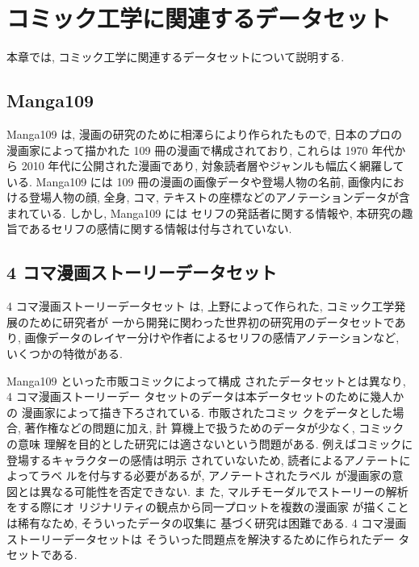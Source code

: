 \newpage
\changeindent{0cm}
\section{コミック工学に関連するデータセット}
\changeindent{2cm}

本章では, コミック工学に関連するデータセットについて説明する.

\changeindent{0cm}
\subsection{Manga109}
\changeindent{2cm}

Manga109 \cite{mtap_matsui_2017} は,
漫画の研究のために相澤らにより作られたもので, 日本のプロの漫画家によって描かれた 109 冊の漫画で構成されており, これらは 1970 年代から 2010 年代に公開された漫画であり, 対象読者層やジャンルも幅広く網羅している. Manga109 には 109 冊の漫画の画像データや登場人物の名前, 画像内における登場人物の顔, 全身, コマ, テキストの座標などのアノテーションデータが含まれている.
しかし, Manga109 には
セリフの発話者に関する情報や, 本研究の趣旨であるセリフの感情に関する情報は付与されていない.

\changeindent{0cm}
\subsection{4 コマ漫画ストーリーデータセット}
\changeindent{2cm}

4 コマ漫画ストーリーデータセット \cite{ueno_miki2018} は, 上野によって作られた, コミック工学発展のために研究者が
一から開発に関わった世界初の研究用のデータセットであり, 画像データのレイヤー分けや作者によるセリフの感情アノテーションなど, いくつかの特徴がある.

Manga109 といった市販コミックによって構成
されたデータセットとは異なり, 4 コマ漫画ストーリーデー
タセットのデータは本データセットのために幾人かの
漫画家によって描き下ろされている. 市販されたコミッ
クをデータとした場合, 著作権などの問題に加え, 計
算機上で扱うためのデータが少なく, コミックの意味
理解を目的とした研究には適さないという問題がある.
例えばコミックに登場するキャラクターの感情は明示
されていないため, 読者によるアノテートによってラベ
ルを付与する必要があるが, アノテートされたラベル
が漫画家の意図とは異なる可能性を否定できない. ま
た, マルチモーダルでストーリーの解析をする際にオ
リジナリティの観点から同一プロットを複数の漫画家
が描くことは稀有なため, そういったデータの収集に
基づく研究は困難である. 4 コマ漫画ストーリーデータセットは
そういった問題点を解決するために作られたデー
タセットである.

